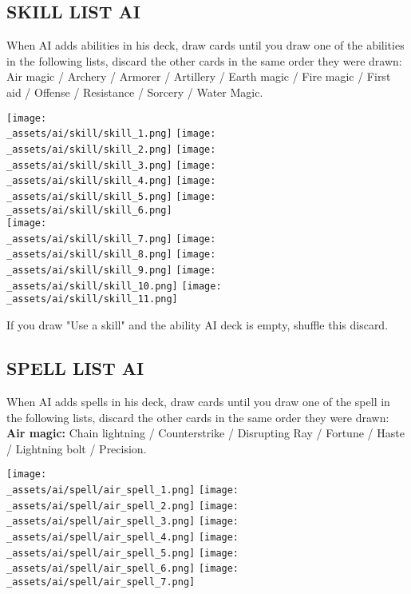 \subsection*{\MakeUppercase{Skill list AI}}
When AI adds abilities in his deck, draw cards until you draw one of the abilities in the following lists, discard the other cards in the same order they were drawn: 
Air magic / Archery / Armorer / Artillery / Earth magic / Fire magic / First aid / Offense / Resistance / Sorcery / Water Magic. 
\begin{center}
    \texttt{[image: \\\_assets/ai/skill/skill\_1.png]}
    \texttt{[image: \\\_assets/ai/skill/skill\_2.png]}
    \texttt{[image: \\\_assets/ai/skill/skill\_3.png]}
    \texttt{[image: \\\_assets/ai/skill/skill\_4.png]}
    \texttt{[image: \\\_assets/ai/skill/skill\_5.png]}
    \texttt{[image: \\\_assets/ai/skill/skill\_6.png]}\\
    \texttt{[image: \\\_assets/ai/skill/skill\_7.png]}
    \texttt{[image: \\\_assets/ai/skill/skill\_8.png]}
    \texttt{[image: \\\_assets/ai/skill/skill\_9.png]}
    \texttt{[image: \\\_assets/ai/skill/skill\_10.png]}
    \texttt{[image: \\\_assets/ai/skill/skill\_11.png]}
\end{center}

If you draw "Use a skill" and the ability AI deck is empty, shuffle this discard.

\newpage

\subsection*{\MakeUppercase{Spell list AI}}
When AI adds spells in his deck, draw cards until you draw one of the spell in the following lists, discard the other cards in the same order they were drawn: \\
\textbf{Air magic:} Chain lightning / Counterstrike / Disrupting Ray / Fortune / Haste / Lightning bolt / Precision.
\begin{center}
    \texttt{[image: \\\_assets/ai/spell/air\_spell\_1.png]}
    \texttt{[image: \\\_assets/ai/spell/air\_spell\_2.png]}
    \texttt{[image: \\\_assets/ai/spell/air\_spell\_3.png]}
    \texttt{[image: \\\_assets/ai/spell/air\_spell\_4.png]}
    \texttt{[image: \\\_assets/ai/spell/air\_spell\_5.png]}
    \texttt{[image: \\\_assets/ai/spell/air\_spell\_6.png]}
    \texttt{[image: \\\_assets/ai/spell/air\_spell\_7.png]}
\end{center}

